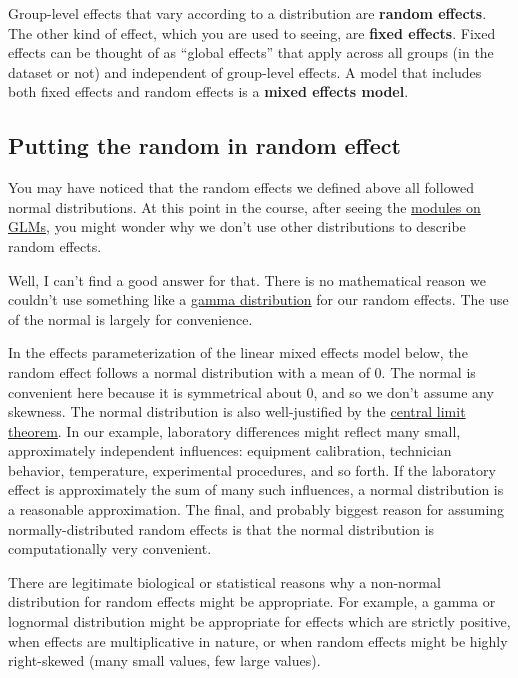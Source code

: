 \documentclass[
  13,
  letterpaper,
]{report}
\begin{document}
Group-level effects that vary according to a distribution are
\textbf{random effects}. The other kind of effect, which you are used to
seeing, are \textbf{fixed effects}. Fixed effects can be thought of as
``global effects'' that apply across all groups (in the dataset or not)
and independent of group-level effects. A model that includes both fixed
effects and random effects is a \textbf{mixed effects model}.

\subsection{Putting the random in random
effect}\label{sec-mixed-intro-rand}

You may have noticed that the random effects we defined above all
followed normal distributions. At this point in the course, after seeing
the \hyperref[sec-glm1-review]{modules on GLMs}, you might wonder why we
don't use other distributions to describe random effects.

Well, I can't find a good answer for that. There is no mathematical
reason we couldn't use something like a
\href{https://en.wikipedia.org/wiki/Gamma_distribution}{gamma
distribution} for our random effects. The use of the normal is largely
for convenience.

In the effects parameterization of the linear mixed effects model below,
the random effect follows a normal distribution with a mean of 0. The
normal is convenient here because it is symmetrical about 0, and so we
don't assume any skewness. The normal distribution is also
well-justified by the
\href{https://en.wikipedia.org/wiki/Central_limit_theorem}{central limit
theorem}. In our example, laboratory differences might reflect many
small, approximately independent influences: equipment calibration,
technician behavior, temperature, experimental procedures, and so forth.
If the laboratory effect is approximately the sum of many such
influences, a normal distribution is a reasonable approximation. The
final, and probably biggest reason for assuming normally-distributed
random effects is that the normal distribution is computationally very
convenient.

There are legitimate biological or statistical reasons why a non-normal
distribution for random effects might be appropriate. For example, a
gamma or lognormal distribution might be appropriate for effects which
are strictly positive, when effects are multiplicative in nature, or
when random effects might be highly right-skewed (many small values, few
large values).
\end{document}
